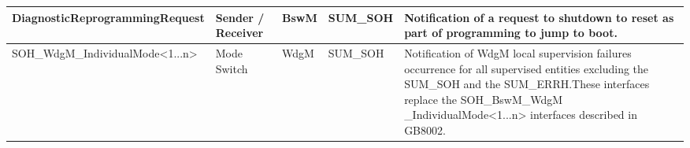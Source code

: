 \begin{longtable}{|l|l|l|l|l|}
\begin{minipage}{0.42\linewidth}\raggedright\vspace{.75ex}DiagnosticReprogrammingRequest\vspace{.75ex}\end{minipage} & \begin{minipage}{0.07\linewidth}\raggedright\vspace{.75ex}Sender / Receiver\vspace{.75ex}\end{minipage} & \begin{minipage}{0.10\linewidth}\raggedright\vspace{.75ex}BswM\vspace{.75ex}\end{minipage} & \begin{minipage}{0.10\linewidth}\raggedright\vspace{.75ex}SUM\_SOH\vspace{.75ex}\end{minipage} & \begin{minipage}{0.17\linewidth}\raggedright\vspace{.75ex}Notification of a request to shutdown to reset as part of programming to jump to boot.\vspace{.75ex}\end{minipage}\\\hline
\begin{minipage}{0.42\linewidth}\raggedright\vspace{.75ex}SOH\_WdgM\_IndividualMode<1...n>\vspace{.75ex}\end{minipage} & \begin{minipage}{0.07\linewidth}\raggedright\vspace{.75ex}Mode Switch\vspace{.75ex}\end{minipage} & \begin{minipage}{0.10\linewidth}\raggedright\vspace{.75ex}WdgM\vspace{.75ex}\end{minipage} & \begin{minipage}{0.10\linewidth}\raggedright\vspace{.75ex}SUM\_SOH\vspace{.75ex}\end{minipage} & \begin{minipage}{0.17\linewidth}\raggedright\vspace{.75ex}Notification of WdgM local supervision failures occurrence for all supervised entities excluding the SUM\_SOH and the SUM\_ERRH.\newline \footnotesize{These interfaces replace the SOH\_BswM\_WdgM \_IndividualMode<1...n> interfaces described in GB8002.}\vspace{.75ex}\end{minipage}\\\hline

\end{longtable}
